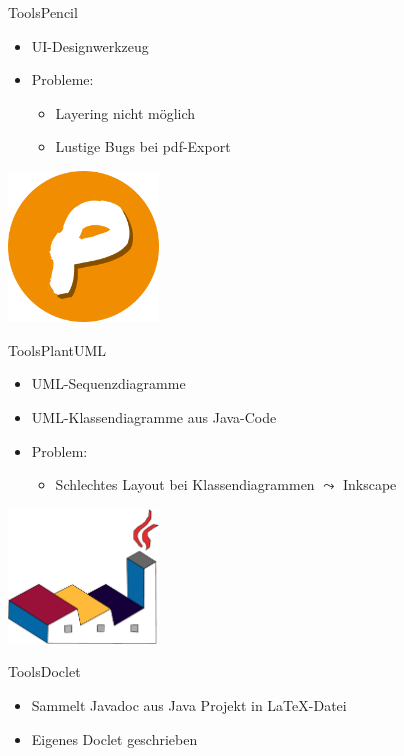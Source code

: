 \documentclass[10pt]{beamer}
\begin{document}
\begin{frame}{Tools}{Pencil}
	\begin{itemize}
		\item UI-Designwerkzeug
		\item Probleme:
			\begin{itemize}
				\item Layering nicht möglich
				\item Lustige Bugs bei pdf-Export
			\end{itemize} 
	\end{itemize}
	\vspace{2cm}
    \hfill\includegraphics[width = 0.3\textwidth]{img/pencil}
\end{frame}

\begin{frame}[t]{Tools}{PlantUML}
	\begin{itemize}
		\item UML-Sequenzdiagramme
		\item UML-Klassendiagramme aus Java-Code
		\item Problem: 
			\begin{itemize}
				\item Schlechtes Layout bei Klassendiagrammen $\leadsto$ Inkscape
			\end{itemize}
	\end{itemize}
	\vspace{2cm}
    \hfill\includegraphics[width = 0.3\textwidth]{img/plantuml-cropped}
\end{frame}

\begin{frame}[t]{Tools}{Doclet}
	\begin{itemize}
		\item Sammelt Javadoc aus Java Projekt in \LaTeX{}-Datei
		\item Eigenes Doclet geschrieben
	\end{itemize}
\end{frame}
\end{document}
